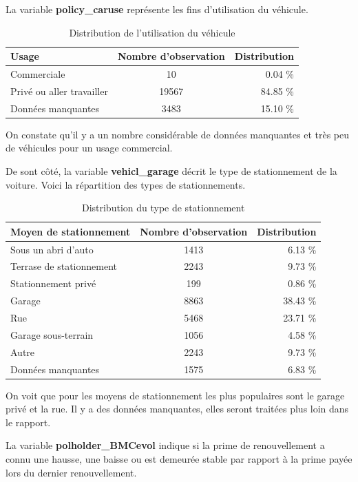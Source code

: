 \documentclass[
]{article}
\begin{document}
La variable \textbf{policy\_caruse} représente les fins d'utilisation du
véhicule.

\begin{table}[ht]
\centering
\caption{Distribution de l'utilisation du véhicule} 
\label{tbl:policyCaruse}
\begin{tabular}{lcr}
  \hline
Usage & Nombre d'observation & Distribution \\ 
  \hline
Commerciale & 10 & 0.04 \% \\ 
  Privé ou aller travailler & 19567 & 84.85 \% \\ 
  Données manquantes & 3483 & 15.10 \% \\ 
   \hline
\end{tabular}
\end{table}

On constate qu'il y a un nombre considérable de données manquantes et
très peu de véhicules pour un usage commercial.

De sont côté, la variable \textbf{vehicl\_garage} décrit le type de
stationnement de la voiture. Voici la répartition des types de
stationnements.

\begin{table}[ht]
\centering
\caption{Distribution du type de stationnement} 
\label{tbl:policyGarage}
\begin{tabular}{lcr}
  \hline
Moyen de stationnement & Nombre d'observation & Distribution \\ 
  \hline
Sous un abri d'auto & 1413 & 6.13 \% \\ 
  Terrase de stationnement & 2243 & 9.73 \% \\ 
  Stationnement privé & 199 & 0.86 \% \\ 
  Garage & 8863 & 38.43 \% \\ 
  Rue & 5468 & 23.71 \% \\ 
  Garage sous-terrain & 1056 & 4.58 \% \\ 
  Autre & 2243 & 9.73 \% \\ 
  Données manquantes & 1575 & 6.83 \% \\ 
   \hline
\end{tabular}
\end{table}

On voit que pour les moyens de stationnement les plus populaires sont le
garage privé et la rue. Il y a des données manquantes, elles seront
traitées plus loin dans le rapport.

La variable \textbf{polholder\_BMCevol} indique si la prime de
renouvellement a connu une hausse, une baisse ou est demeurée stable par
rapport à la prime payée lors du dernier renouvellement.
\end{document}
